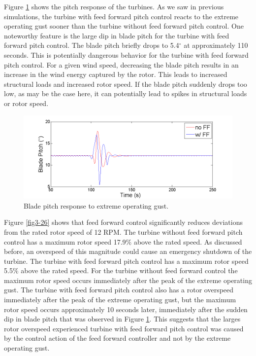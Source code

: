 Figure \ref{fig3-25} shows the pitch response of the turbines. As we saw in previous simulations, the turbine with feed forward pitch control reacts to the extreme operating gust sooner than the turbine without feed forward pitch control. One noteworthy feature is the large dip in blade pitch for the turbine with feed forward pitch control. The blade pitch briefly drops to 5.4$^\circ$ at approximately 110 seconds. This is potentially dangerous behavior for the turbine with feed forward pitch control. For a given wind speed, decreasing the blade pitch results in an increase in the wind energy captured by the rotor. This leads to increased structural loads and increased rotor speed. If the blade pitch suddenly drops too low, as may be the case here, it can potentially lead to spikes in structural loads or rotor speed. 

\begin{figure}[htbp]
	\centering
		\includegraphics[trim = {1cm 0 2cm 0}, clip, width = \linewidth]{Figures/ch3Figures/fig3-25.png}
		
	\caption{Blade pitch response to extreme operating gust. }
	\label{fig3-25}
\end{figure}

Figure \ref{fig3-26} shows that feed forward control significantly reduces deviations from the rated rotor speed of 12 RPM. The turbine without feed forward pitch control has a maximum rotor speed 17.9$\%$ above the rated speed. As discussed before, an overspeed of this magnitude could cause an emergency shutdown of the turbine. The turbine with feed forward pitch control has a maximum rotor speed 5.5$\%$ above the rated speed. For the turbine without feed forward control the maximum rotor speed occurs immediately after the peak of the extreme operating gust. The turbine with feed forward pitch control also has a rotor overspeed immediately after the peak of the extreme operating gust, but the maximum rotor speed occurs approximately 10 seconds later, immediately after the sudden dip in blade pitch that was observed in Figure \ref{fig3-25}. This suggests that the larges rotor overspeed experienced turbine with feed forward pitch control was caused by the control action of the feed forward controller and not by the extreme operating gust.

